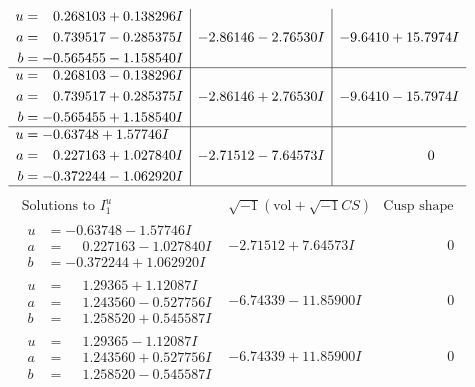 \documentclass[1p]{elsarticle_modified}
\theoremstyle{definition}
\newcommand{\I}{\sqrt{-1}}
\begin{document}
$$\begin{array}{c|c|c}
\begin{aligned}
u &= \phantom{-}0.268103 + 0.138296 I \\
a &= \phantom{-}0.739517 - 0.285375 I \\
b &= -0.565455 - 1.158540 I\end{aligned}
 & -2.86146 - 2.76530 I & -9.6410 + 15.7974 I \\ \hline\begin{aligned}
u &= \phantom{-}0.268103 - 0.138296 I \\
a &= \phantom{-}0.739517 + 0.285375 I \\
b &= -0.565455 + 1.158540 I\end{aligned}
 & -2.86146 + 2.76530 I & -9.6410 - 15.7974 I \\ \hline\begin{aligned}
u &= -0.63748 + 1.57746 I \\
a &= \phantom{-}0.227163 + 1.027840 I \\
b &= -0.372244 - 1.062920 I\end{aligned}
 & -2.71512 - 7.64573 I & \phantom{-0.000000 } 0\\
 \hline 
 \end{array}$$\newpage$$\begin{array}{c|c|c}  
\text{Solutions to }I^u_{1}& \I (\text{vol} + \sqrt{-1}CS) & \text{Cusp shape}\\
 \hline 
\begin{aligned}
u &= -0.63748 - 1.57746 I \\
a &= \phantom{-}0.227163 - 1.027840 I \\
b &= -0.372244 + 1.062920 I\end{aligned}
 & -2.71512 + 7.64573 I & \phantom{-0.000000 } 0 \\ \hline\begin{aligned}
u &= \phantom{-}1.29365 + 1.12087 I \\
a &= \phantom{-}1.243560 - 0.527756 I \\
b &= \phantom{-}1.258520 + 0.545587 I\end{aligned}
 & -6.74339 - 11.85900 I & \phantom{-0.000000 } 0 \\ \hline\begin{aligned}
u &= \phantom{-}1.29365 - 1.12087 I \\
a &= \phantom{-}1.243560 + 0.527756 I \\
b &= \phantom{-}1.258520 - 0.545587 I\end{aligned}
 & -6.74339 + 11.85900 I & \phantom{-0.000000 } 0 \\ \hline\begin{aligned}

\end{aligned}
\end{array}$$
\end{document}
